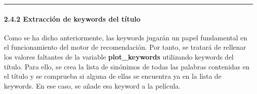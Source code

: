     \begin{center}\rule{0.5\linewidth}{\linethickness}\end{center}

\paragraph{2.4.2 Extracción de keywords del
título}\label{extracciuxf3n-de-keywords-del-tuxedtulo}

Como se ha dicho anteriormente, las keywords jugarán un papel
fundamental en el funcionamiento del motor de recomendación. Por tanto,
se tratará de rellenar los valores faltantes de la variable
\textbf{plot\_keywords} utilizando keywords del título. Para ello, se
crea la lista de sinónimos de todas las palabras contenidas en el título
y se comprueba si alguna de ellas se encuentra ya en la lista de
keywords. En ese caso, se añade esa keyword a la película.

